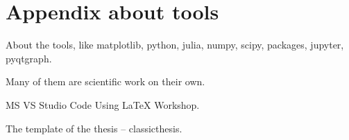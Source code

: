 \chapter{Appendix about tools}
\label{ch:tools_appendix}

About the tools, like matplotlib, python, julia, numpy, scipy, packages, jupyter, pyqtgraph.

Many of them are scientific work on their own.

MS VS Studio Code Using LaTeX Workshop.

The template of the thesis -- classicthesis.
